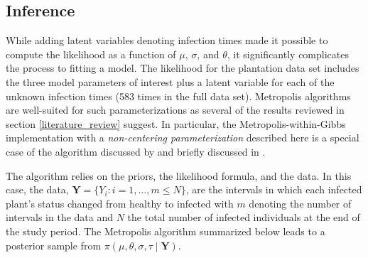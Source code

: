 \documentclass{uwstat572}
\begin{document}
\subsection{Inference}
\label{inference}
While adding latent variables denoting infection times made it possible to compute the likelihood as a function of $\mu$, $\sigma$, and $\theta$, it significantly complicates the process to fitting a model. 
The likelihood for the plantation data set includes the three model parameters of interest plus a latent variable for each of the unknown infection times (583 times in the full data set). 
Metropolis algorithms are well-suited for such parameterizations as several of the results reviewed in section \ref{literature_review} suggest.  
In particular, the Metropolis-within-Gibbs implementation with a \textit{non-centering parameterization} described here is a special case of the algorithm discussed by \citet{Jewell} and briefly discussed in \citep{ONeill}.  

The algorithm relies on the priors, the likelihood formula, and the data. 
In this case, the data, $\textbf{Y} = \{Y_i:i=1,\dots, m \le N\}$, are the intervals in which each infected plant's status changed from healthy to infected with $m$ denoting the number of intervals in the data and $N$ the total number of infected individuals at the end of the study period. 
The Metropolis algorithm summarized below leads to a posterior sample from $\pi(\mu, \theta, \sigma, \tau \mid \textbf{Y})$. 
\end{document}

